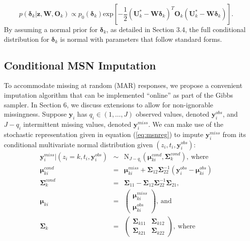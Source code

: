 \documentclass[useAMS,referee]{biom}
\begin{document}
\begin{equation}
	p(\boldsymbol\delta_k|\mathbf{z},\mathbf{W}, \mathbf{O}_k) \propto p_0(\boldsymbol\delta_k) \text{exp} \left [ - \frac{1}{2} (\mathbf{U}^*_k - \mathbf{W}\boldsymbol\delta_k)^T \mathbf{O}_k (\mathbf{U}^*_k - \mathbf{W}\boldsymbol\delta_k)\right].
\end{equation}
By assuming a normal prior for $\boldsymbol\delta_k$, as detailed in Section 3.4, the full conditional distribution for $\boldsymbol\delta_k$ is normal with parameters that follow standard forms.
\subsection{Conditional MSN Imputation}
To accommodate missing at random (MAR) responses, we propose a convenient imputation algorithm that can be implemented ``online'' as part of the Gibbs sampler. In Section 6, we discuss extensions to allow for non-ignorable missingness. Suppose $\mathbf{y}_i$ has $q_i\in (1,\ldots,J)$ observed values, denoted $\mathbf{y}^{obs}_i$, and $J-q_i$ intermittent missing values, denoted $\mathbf{y}^{miss}_i$. We can make use of the stochastic representation given in equation (\ref{eq:msnreg}) to impute $\mathbf{y}^{miss}_i$ from its conditional multivariate normal distribution given $(z_i,t_i,\mathbf{y}^{obs}_i)$:
\begin{eqnarray}
\mathbf{y}^{miss}_i|(z_i=k,t_i,\mathbf{y}^{obs}_i)&\sim& \text{N}_{J-q_i}(\boldsymbol\mu^{cond}_{ki},\boldsymbol\Sigma^{cond}_k),~\text{where}\nonumber\\
\boldsymbol\mu^{cond}_{ki}&=& \boldsymbol\mu^{miss}_{ki} + \boldsymbol\Sigma_{12} \boldsymbol\Sigma_{22}^{-1}(\mathbf{y}^{obs}_i - \boldsymbol\mu^{obs}_{ki}) \label{eq:impute}\\
\boldsymbol\Sigma^{cond}_k&=& \boldsymbol\Sigma_{11} - \boldsymbol\Sigma_{12}\boldsymbol\Sigma_{22}^{-1}\boldsymbol\Sigma_{21},\nonumber \\
\boldsymbol\mu_{ki} &=& \begin{pmatrix} \boldsymbol\mu_{ki}^{miss} \\ \boldsymbol\mu_{ki}^{obs} \end{pmatrix}, \ \text{and} \nonumber \\
\boldsymbol\Sigma_k &=& \begin{pmatrix} 
	\boldsymbol\Sigma_{k11} & \boldsymbol\Sigma_{k12}\\
	\boldsymbol\Sigma_{k21} & \boldsymbol\Sigma_{k22}
\end{pmatrix}, \ \text{where} \nonumber
\end{eqnarray}
\end{document}
